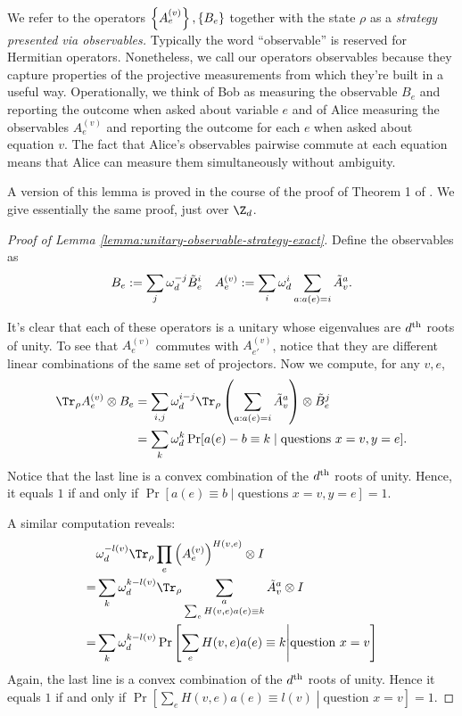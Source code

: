 We refer to the operators $\left\{A_e^{(v)}\right\}, \left\{B_e\right\}$ together with the state $\rho$ as a \emph{strategy presented via observables.}
Typically the word ``observable'' is reserved for Hermitian operators. Nonetheless, we call our operators observables because they capture properties of the projective measurements from which they're built in a useful way. Operationally, we think of Bob as measuring the observable $B_e$ and reporting the outcome when asked about variable $e$ and of Alice measuring the observables $A_e^{(v)}$ and reporting the outcome for each $e$ when asked about equation $v$. The fact that Alice's observables pairwise commute at each equation means that Alice can measure them simultaneously without ambiguity.

A version of this lemma is proved in the course of the proof of Theorem 1 of \cite{cleve2014characterization}. We give essentially the same proof, just over $\Z_d$.
\begin{proof}[Proof of Lemma \ref{lemma:unitary-observable-strategy-exact}]
	Define the observables as
	\begin{align}
		B_e:= \sum_j\omega_d^{-j}\tilde B^{i}_{e}
		&& 
		A_e^{(v)}:= \sum_i \omega_d^i\sum_{a: a(e) =i} \tilde A_{v}^a.
	\end{align}

	It's clear that each of these operators is a unitary whose eigenvalues are $d\textsuperscript{th}$ roots of unity. To see that $A_e^{(v)}$ commutes with $A_{e'}^{(v)}$, notice that they are different linear combinations of the same set of projectors. Now we compute, for any $v,e$,
	\begin{align}
		\Tr_\rho A_e^{(v)}\otimes B_e 
			&= \sum_{i,j}\w_d^{i-j}\Tr_\rho \left(\sum_{a: a(e) =i} \tilde A_{v}^a\right)\otimes \tilde B^{j}_{e} 
		\\	&= \sum_k \w_d^k\Pr[a(e) - b \equiv k\mid \text{questions } x=v, y=e].
	\end{align}
	Notice that the last line is a convex combination of the $d\textsuperscript{th}$ roots of unity. Hence, it equals $1$ if and only if $\Pr[a(e) \equiv b \mid \text{questions } x=v, y=e] = 1$.

	A similar computation reveals:
	\begin{align}
		 &\w_d^{-l(v)} \Tr_\rho \prod_{e} \left(A_e^{(v)}\right)^{H(v,e)}\otimes I \\
		= & \sum_k\w_d^{k-l(v)} \Tr_\rho \sum_{\substack{a\\ \sum_e H(v,e)a(e)\equiv k}} \tilde A_{v}^a\otimes I \\
		= & \sum_k \w_d^{k-l(v)}\Pr\left[\sum_{e}H(v,e)a(e)\equiv k\middle|  \text{question } x=v\right]
	\end{align}
Again, the last line is a convex combination of the $d\textsuperscript{th}$ roots of unity. Hence it equals $1$ if and only if $\Pr\left[\sum_{e}H(v,e)a(e)\equiv l(v) \middle|  \text{question } x=v\right] = 1$. 
\end{proof}


